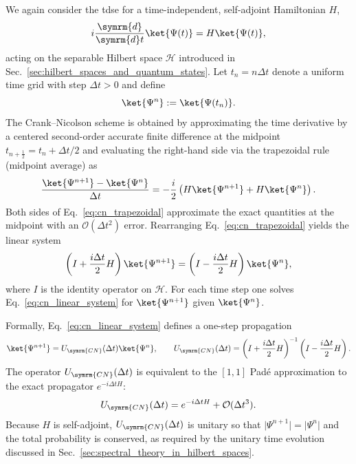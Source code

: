 We again consider the \acrshort{tdse} for a time-independent, self-adjoint Hamiltonian $H$,
\begin{equation}\label{eq:tdse_cn}
i\frac{\symrm{d}}{\symrm{d}t}\ket{\Psi(t)}=H\ket{\Psi(t)},
\end{equation}
acting on the separable Hilbert space $\mathcal{H}$ introduced in Sec.~\ref{sec:hilbert_spaces_and_quantum_states}. Let $t_n=n\Delta t$ denote a uniform time grid with step $\Delta t>0$ and define
\begin{equation}
\ket{\Psi^n}:=\ket{\Psi(t_n)}.
\end{equation}
The Crank–Nicolson scheme is obtained by approximating the time derivative by a centered second-order accurate finite difference at the midpoint $t_{n+\frac12}=t_n+\Delta t/2$ and evaluating the right-hand side via the trapezoidal rule (midpoint average) as
\begin{equation}\label{eq:cn_trapezoidal}
\frac{\ket{\Psi^{n+1}}-\ket{\Psi^n}}{\Delta t}=-\frac{i}{2}\left(H\ket{\Psi^{n+1}}+H\ket{\Psi^n}\right).
\end{equation}
Both sides of Eq.~\eqref{eq:cn_trapezoidal} approximate the exact quantities at the midpoint
with an $\mathcal{O}(\Delta t^2)$ error. Rearranging Eq.~\eqref{eq:cn_trapezoidal} yields the linear system
\begin{equation}\label{eq:cn_linear_system}
\left(I+\frac{i\Delta t}{2}H\right)\ket{\Psi^{n+1}}=\left(I-\frac{i\Delta t}{2}H\right)\ket{\Psi^n},
\end{equation}
where $I$ is the identity operator on $\mathcal{H}$. For each time step one solves Eq.~\eqref{eq:cn_linear_system} for $\ket{\Psi^{n+1}}$ given $\ket{\Psi^n}$.

Formally, Eq.~\eqref{eq:cn_linear_system} defines a one-step propagation
\begin{equation}\label{eq:cn_propagator_operator}
\ket{\Psi^{n+1}}=U_{\symrm{CN}}(\Delta t)\ket{\Psi^n},\qquad U_{\symrm{CN}}(\Delta t)=\left(I+\frac{i\Delta t}{2}H\right)^{-1}\left(I-\frac{i\Delta t}{2}H\right).
\end{equation}
The operator $U_{\symrm{CN}}(\Delta t)$ is equivalent to the $[1,1]$ Padé approximation to the exact propagator $e^{-i\Delta t H}$:
\begin{equation}
U_{\symrm{CN}}(\Delta t)=e^{-i\Delta t H}+\mathcal{O}(\Delta t^3).
\end{equation}
Because $H$ is self-adjoint, $U_{\symrm{CN}}(\Delta t)$ is unitary so that $\lvert\Psi^{n+1}\rvert=\lvert\Psi^n\rvert$ and the total probability is conserved, as required by the unitary time evolution discussed in Sec.~\ref{sec:spectral_theory_in_hilbert_spaces}.
